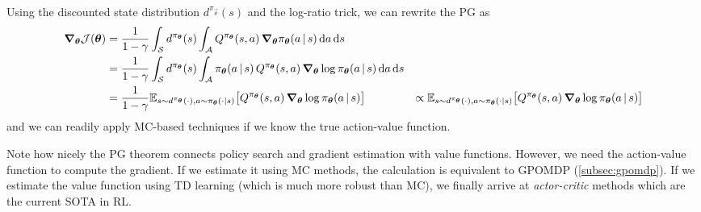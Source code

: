 		\begin{remark}
			Using the discounted state distribution \( d^{\pi_{\vec{\theta}}}(s) \) and the log-ratio trick, we can rewrite the \ac{PG} as
			\begin{align}
				\grad_{\bm{\theta}} \mathcal{J}(\bm{\theta})
					&= \frac{1}{1 - \gamma} \int_\mathcal{S} d^{\pi_{\bm{\theta}}}(s) \int_\mathcal{A} Q^{\pi_{\bm{\theta}}}(s, a) \, \grad_{\bm{\theta}} \pi_{\bm{\theta}}(a \,\vert\, s) \dd{a} \dd{s} \\
					&= \frac{1}{1 - \gamma} \int_\mathcal{S} d^{\pi_{\bm{\theta}}}(s) \int_\mathcal{A} \pi_{\bm{\theta}}(a \,\vert\, s) \, Q^{\pi_{\bm{\theta}}}(s, a) \, \grad_{\bm{\theta}} \log \pi_{\bm{\theta}}(a \,\vert\, s) \dd{a} \dd{s} \\
					&= \frac{1}{1 - \gamma} \mathbb{E}_{s \sim d^{\pi_{\bm{\theta}}}(\cdot), a \sim \pi_{\bm{\theta}}(\cdot \vert s)}\bigl[ Q^{\pi_{\bm{\theta}}}(s, a) \, \grad_{\bm{\theta}} \log \pi_{\bm{\theta}}(a \,\vert\, s) \bigr]
					&\propto \mathbb{E}_{s \sim d^{\pi_{\bm{\theta}}}(\cdot), a \sim \pi_{\bm{\theta}}(\cdot \vert s)}\bigl[ Q^{\pi_{\bm{\theta}}}(s, a) \, \grad_{\bm{\theta}} \log \pi_{\bm{\theta}}(a \,\vert\, s) \bigr]  \label{eq:pgt}
			\end{align}
			and we can readily apply \ac{MC}-based techniques if we know the true action-value function.
		\end{remark}

		Note how nicely the \ac{PG} theorem connects policy search and gradient estimation with value functions. However, we need the action-value function to compute the gradient. If we estimate it using \ac{MC} methods, the calculation is equivalent to \ac{GPOMDP} (\autoref{subsec:gpomdp}). If we estimate the value function using \ac{TD} learning (which is much more robust than \ac{MC}), we finally arrive at \emph{actor-critic} methods which are the current \ac{SOTA} in \ac{RL}.

